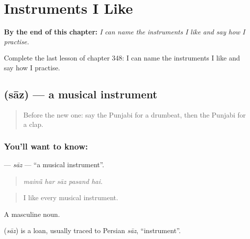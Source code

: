
\chapter{Instruments I Like}
\label{ch:pa-a2-instruments-i-like}

\begin{chapteropening}
\textbf{By the end of this chapter:} \emph{I can name the instruments I like and say how I practise.}

Complete the last lesson of chapter 348: I can name the instruments I like and say how I practise.
\end{chapteropening}

\section[\texorpdfstring{\pa{ਸਾਜ਼} (sāz)}{ਸਾਜ਼ (sāz)}]{ (sāz) — a musical instrument}

\label{lesson:PA-C348-saz}



\begin{quote}
Before the new one: say the Punjabi for a drumbeat, then the Punjabi for a clap.
\end{quote}

\subsection*{You'll want to know: }
\textbf{} — \emph{sāz} — \textquotedblleft{}a musical instrument\textquotedblright{}.

\begin{quote}
    
\end{quote}

\begin{quote}
\emph{mainū̃ har sāz pasand hai.}
\end{quote}

\begin{quote}
I like every musical instrument.
\end{quote}

A masculine noun.

\begin{cousinweb}
\textbf{} (\emph{sāz}) is a loan, usually traced to Persian \emph{sāz}, \textquotedblleft{}instrument\textquotedblright{}.
\end{cousinweb}

